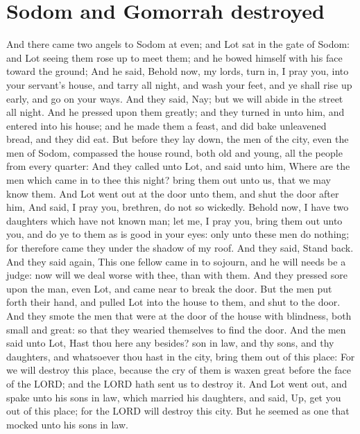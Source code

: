 \section*{Sodom and Gomorrah destroyed}
\begin{biblechapter} %
\verse And there came two angels to Sodom at even; and Lot sat in the gate of Sodom: and Lot seeing them rose up to meet them; and he bowed himself with his face toward the ground;
\verse And he said, Behold now, my lords, turn in, I pray you, into your servant's house, and tarry all night, and wash your feet, and ye shall rise up early, and go on your ways. And they said, Nay; but we will abide in the street all night.
\verse And he pressed upon them greatly; and they turned in unto him, and entered into his house; and he made them a feast, and did bake unleavened bread, and they did eat.
\verse But before they lay down, the men of the city, even the men of Sodom, compassed the house round, both old and young, all the people from every quarter:
\verse And they called unto Lot, and said unto him, Where are the men which came in to thee this night? bring them out unto us, that we may know them.
\verse And Lot went out at the door unto them, and shut the door after him,
\verse And said, I pray you, brethren, do not so wickedly.
\verse Behold now, I have two daughters which have not known man; let me, I pray you, bring them out unto you, and do ye to them as is good in your eyes: only unto these men do nothing; for therefore came they under the shadow of my roof.
\verse And they said, Stand back. And they said again, This one fellow came in to sojourn, and he will needs be a judge: now will we deal worse with thee, than with them. And they pressed sore upon the man, even Lot, and came near to break the door.
\verse But the men put forth their hand, and pulled Lot into the house to them, and shut to the door.
\verse And they smote the men that were at the door of the house with blindness, both small and great: so that they wearied themselves to find the door.
\verse And the men said unto Lot, Hast thou here any besides? son in law, and thy sons, and thy daughters, and whatsoever thou hast in the city, bring them out of this place:
\verse For we will destroy this place, because the cry of them is waxen great before the face of the LORD; and the LORD hath sent us to destroy it.
\verse And Lot went out, and spake unto his sons in law, which married his daughters, and said, Up, get you out of this place; for the LORD will destroy this city. But he seemed as one that mocked unto his sons in law.

\end{biblechapter}
